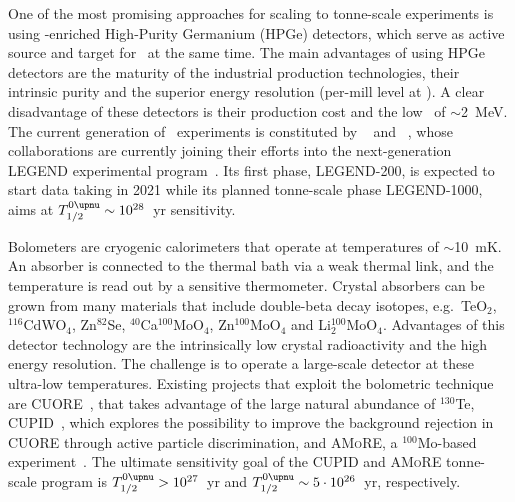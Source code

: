 \begin{description}[wide]
  \item[Semiconductors] One of the most promising approaches for scaling to
    tonne-scale experiments is using \gesix-enriched High-Purity Germanium
    (HPGe) detectors, which serve as active source and target for \onbb\ at the
    same time. The main advantages of using HPGe detectors are the maturity of
    the industrial production technologies, their intrinsic purity and the
    superior energy resolution (per-mill level at \qbb).  A clear disadvantage
    of these detectors is their production cost and the low \qbb\ of
    $\sim$2~MeV. The current generation of \gesix\ experiments is constituted
    by \gerda~\cite{Budjas2013} and \majoranademo~\cite{Abgrall2014}, whose
    collaborations are currently joining their efforts into the next-generation
    LEGEND experimental program~\cite{Abgrall2017}. Its first phase, LEGEND-200,
    is expected to start data taking in 2021 while its planned tonne-scale phase
    LEGEND-1000, aims at $\thalfzeroM \sim 10^{28}$~yr sensitivity.

  \item[Bolometers] Bolometers are cryogenic calorimeters that operate at
    temperatures of $\sim$10~mK. An absorber is connected to the thermal bath
    via a weak thermal link, and the temperature is read out by a sensitive
    thermometer. Crystal absorbers can be grown from many materials that
    include double-beta decay isotopes, e.g.~TeO$_2$, $^{116}$CdWO$_4$,
    Zn$^{82}$Se, $^{40}$Ca$^{100}$MoO$_4$, Zn$^{100}$MoO$_4$ and
    Li$_2^{100}$MoO$_4$.  Advantages of this detector technology are the
    intrinsically low crystal radioactivity and the high energy resolution. The
    challenge is to operate a large-scale detector at these ultra-low
    temperatures. Existing projects that exploit the bolometric technique are
    CUORE~\cite{Arnaboldi2002, Artusa2014}, that takes advantage of the large
    natural abundance of $^{130}$Te, CUPID~\cite{Wang2015}, which explores the
    possibility to improve the background rejection in CUORE through active
    particle discrimination, and \textsc{AMoRE}, a $^{100}$Mo-based
    experiment~\cite{Kim2015}. The ultimate sensitivity goal of the CUPID and
    \textsc{AMoRE} tonne-scale program is $\thalfzeroM > 10^{27}$~yr and
    $\thalfzeroM \sim 5 \cdot 10^{26}$~yr, respectively.


\end{description}
